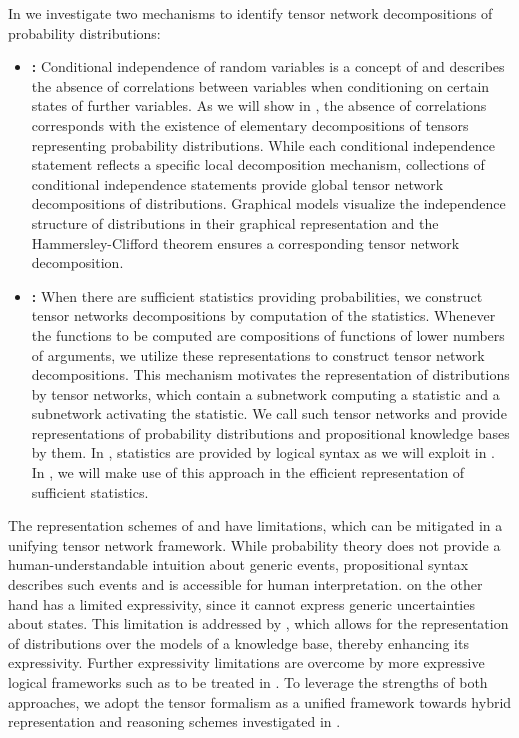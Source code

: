 In  we investigate two mechanisms to identify tensor network decompositions of probability distributions:
\begin{itemize}
    \item \textbf{\IndependenceMechanism{}:}
    Conditional independence of random variables is a concept of \probabilityTheory{} and describes the absence of correlations between variables when conditioning on certain states of further variables.
    As we will show in , the absence of correlations corresponds with the existence of elementary decompositions of tensors representing probability distributions.
    While each conditional independence statement reflects a specific local decomposition mechanism, collections of conditional independence statements provide global tensor network decompositions of distributions.
    Graphical models visualize the independence structure of distributions in their graphical representation and the Hammersley-Clifford theorem ensures a corresponding tensor network decomposition.
    \item \textbf{\ComputationMechanism{}:}
    When there are sufficient statistics providing probabilities, we construct tensor networks decompositions by computation of the statistics.
    Whenever the functions to be computed are compositions of functions of lower numbers of arguments, we utilize these representations to construct tensor network decompositions.
    This mechanism motivates the representation of distributions by tensor networks, which contain a subnetwork computing a statistic and a subnetwork activating the statistic.
    We call such tensor networks \ComputationActivationNetworks{} and provide representations of probability distributions and propositional knowledge bases by them.
    In \propositionalLogic{}, statistics are provided by logical syntax as we will exploit in .
    In \probabilityTheory{}, we will make use of this approach in the efficient representation of sufficient statistics.
\end{itemize}
The representation schemes of \probabilityTheory{} and \propositionalLogic{} have limitations, which can be mitigated in a unifying tensor network framework.
While probability theory does not provide a human-understandable intuition about generic events, propositional syntax describes such events and is accessible for human interpretation.
\PropositionalLogic{} on the other hand has a limited expressivity, since it cannot express generic uncertainties about states.
This limitation is addressed by \probabilityTheory{}, which allows for the representation of distributions over the models of a knowledge base, thereby enhancing its expressivity.
Further expressivity limitations are overcome by more expressive logical frameworks such as \firstOrderLogic{} to be treated in .
To leverage the strengths of both approaches, we adopt the tensor formalism as a unified framework towards hybrid representation and reasoning schemes investigated in .

